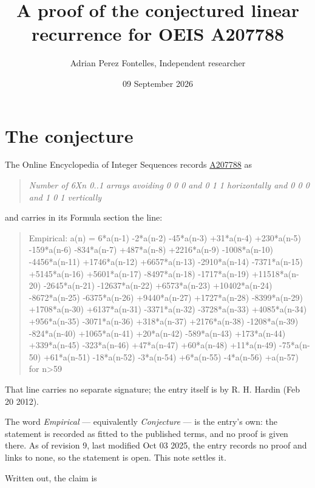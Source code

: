 \documentclass[11pt]{article}
\title{A proof of the conjectured linear recurrence for OEIS A207788}
\author{Adrian Perez Fontelles, Independent researcher}
\date{09 September 2026}
\theoremstyle{definition}
\begin{document}
\maketitle
\section{The conjecture}

The Online Encyclopedia of Integer Sequences records \href{https://oeis.org/A207788}{A207788} as

\begin{quote}\itshape Number of 6Xn 0..1 arrays avoiding 0 0 0 and 0 1 1 horizontally and 0 0 0 and 1 0 1 vertically\end{quote}

and carries in its Formula section the line:

\begin{quote}\ttfamily Empirical: a(n) = 6*a(n-1) -2*a(n-2) -45*a(n-3) +31*a(n-4) +230*a(n-5) -159*a(n-6) -834*a(n-7) +487*a(n-8) +2216*a(n-9) -1008*a(n-10) -4456*a(n-11) +1746*a(n-12) +6657*a(n-13) -2910*a(n-14) -7371*a(n-15) +5145*a(n-16) +5601*a(n-17) -8497*a(n-18) -1717*a(n-19) +11518*a(n-20) -2645*a(n-21) -12637*a(n-22) +6573*a(n-23) +10402*a(n-24) -8672*a(n-25) -6375*a(n-26) +9440*a(n-27) +1727*a(n-28) -8399*a(n-29) +1708*a(n-30) +6137*a(n-31) -3371*a(n-32) -3728*a(n-33) +4085*a(n-34) +956*a(n-35) -3071*a(n-36) +318*a(n-37) +2176*a(n-38) -1208*a(n-39) -824*a(n-40) +1065*a(n-41) +20*a(n-42) -589*a(n-43) +173*a(n-44) +339*a(n-45) -323*a(n-46) +47*a(n-47) +60*a(n-48) +11*a(n-49) -75*a(n-50) +61*a(n-51) -18*a(n-52) -3*a(n-54) +6*a(n-55) -4*a(n-56) +a(n-57) for n>59\end{quote}

That line carries no separate signature; the entry itself is by R. H. Hardin (Feb 20 2012).

The word {\itshape Empirical} --- equivalently {\itshape Conjecture} --- is the entry's own: the statement is recorded as fitted to the published terms, and no proof is given there. As of revision 9, last modified Oct 03 2025, the entry records no proof and links to none, so the statement is open. This note settles it.

Written out, the claim is
\end{document}
